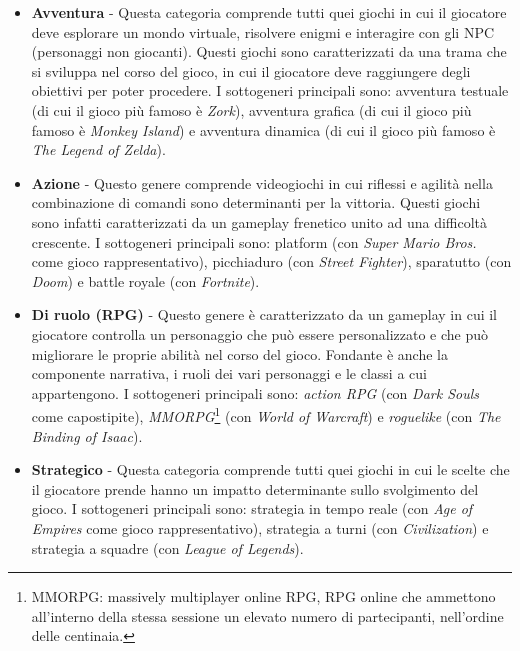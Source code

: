             \begin{itemize}
                \item \textbf{Avventura} - Questa categoria comprende tutti quei giochi in cui il giocatore deve esplorare un mondo virtuale, risolvere enigmi e interagire con gli NPC 
                    (personaggi non giocanti). Questi giochi sono caratterizzati da una trama che si sviluppa nel corso del gioco, in cui il giocatore deve raggiungere degli obiettivi per 
                    poter procedere. I sottogeneri principali sono: avventura testuale (di cui il gioco più famoso è \textit{Zork}), avventura grafica (di cui il gioco più famoso è
                    \textit{Monkey Island}) e avventura dinamica (di cui il gioco più famoso è \textit{The Legend of Zelda}).
                \item \textbf{Azione} - Questo genere comprende videogiochi in cui riflessi e agilità nella combinazione di comandi sono determinanti per la vittoria. Questi giochi sono 
                    infatti caratterizzati da un gameplay frenetico unito ad una difficoltà crescente. I sottogeneri principali sono: platform (con \textit{Super Mario Bros.} 
                    come gioco rappresentativo), picchiaduro (con \textit{Street Fighter}), sparatutto (con \textit{Doom}) e battle royale (con \textit{Fortnite}).
                \item \textbf{Di ruolo (RPG)} - Questo genere è caratterizzato da un gameplay in cui il giocatore controlla un personaggio che può essere personalizzato e che può 
                    migliorare le proprie abilità nel corso del gioco. Fondante è anche la componente narrativa, i ruoli dei vari personaggi e le classi a cui appartengono. I sottogeneri
                    principali sono: \textit{action RPG} (con \textit{Dark Souls} come capostipite), \textit{MMORPG}\footnote{MMORPG: massively multiplayer online RPG, RPG online che ammettono
                    all'interno della stessa sessione un elevato numero di partecipanti, nell'ordine delle centinaia.} (con \textit{World of Warcraft}) e \textit{roguelike} (con \textit{The
                    Binding of Isaac}).
                \item \textbf{Strategico} - Questa categoria comprende tutti quei giochi in cui le scelte che il giocatore prende hanno un impatto determinante sullo svolgimento del gioco.
                    I sottogeneri principali sono: strategia in tempo reale (con \textit{Age of Empires} come gioco rappresentativo), strategia a turni (con \textit{Civilization}) e 
                    strategia a squadre (con \textit{League of Legends}).
                \end{itemize}
        
